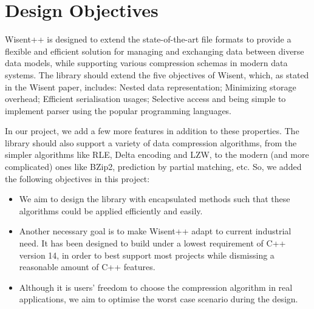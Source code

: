 \section{Design Objectives}

Wisent++ is designed to extend the state-of-the-art file formats to provide a flexible and efficient solution for managing and exchanging data between diverse data models, while supporting various compression schemas in modern data systems. The library should extend the five objectives of Wisent, which, as stated in the Wisent paper, includes: Nested data representation; Minimizing storage overhead; Efficient serialisation usages; Selective access and being simple to implement parser using the popular programming languages. 

In our project, we add a few more features in addition to these properties. The library should also support a variety of data compression algorithms, from the simpler algorithms like RLE, Delta encoding and LZW, to the modern (and more complicated) ones like BZip2, prediction by partial matching, etc.\cite{gupta2017modern} So, we added the following objectives in this project:

\begin{itemize}[label=\textbullet, topsep=0pt] 
\item We aim to design the library with encapsulated methods such that these algorithms could be applied efficiently and easily. 

\item Another necessary goal is to make Wisent++ adapt to current industrial need. It has been designed to build under a lowest requirement of C++ version 14, in order to best support most projects while dismissing a reasonable amount of C++ features.

\item Although it is users' freedom to choose the compression algorithm in real applications, we aim to optimise the worst case scenario during the design. 
\end{itemize}


\newpage




